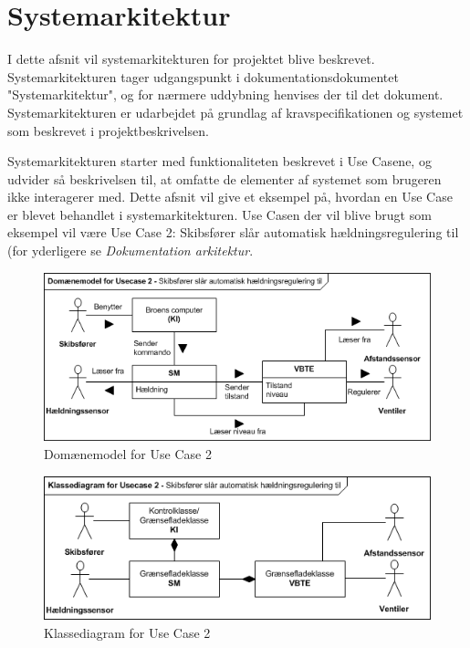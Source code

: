 \section{Systemarkitektur}
\label{ch:systemarkitektur}
I dette afsnit vil systemarkitekturen for projektet blive beskrevet. Systemarkitekturen tager udgangspunkt i dokumentationsdokumentet "Systemarkitektur", og for nærmere uddybning henvises der til det dokument. 
Systemarkitekturen er udarbejdet på grundlag af kravspecifikationen og systemet som beskrevet i projektbeskrivelsen.

Systemarkitekturen starter med funktionaliteten beskrevet i Use Casene, og udvider så beskrivelsen til, at omfatte de elementer af systemet som brugeren ikke interagerer med. Dette afsnit vil give et eksempel på, hvordan en Use Case er blevet behandlet i systemarkitekturen. Use Casen der vil blive brugt som eksempel vil være Use Case 2: Skibsfører slår automatisk hældningsregulering til (for yderligere se \textit{Dokumentation arkitektur}.

\begin{figure}[H]
\centering
\includegraphics[scale=0.8]{billeder/Systemarkitektur/DM_UC2}
\caption{Domænemodel for Use Case 2}
\label{fig:dmuc2}
\end{figure}

\begin{figure}[H]
\centering
\includegraphics[scale=0.8]{billeder/Systemarkitektur/KD_UC2}
\caption{Klassediagram for Use Case 2}
\label{fig:kduc2}
\end{figure}

